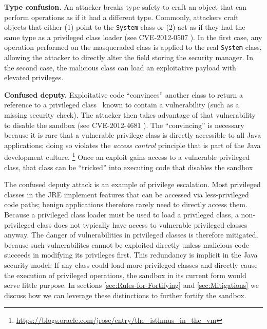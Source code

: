 \documentclass{sig-alternate}
\begin{document}
\noindent\textbf{Type confusion.} An attacker breaks type
safety to craft an object that can perform operations as if it had
a different type. Commonly, attackers craft objects that either
(1) point to the \texttt{System} class or (2) act as if they had
the same type as a privileged class loader (see CVE-2012-0507 \cite{_vulnerability_2012_0507}).
In the first case, any operation performed on the
masqueraded class is applied to the real \texttt{System} class, allowing
the attacker to directly alter the field storing the security manager. 
In the second case, the malicious class can load an exploitative
payload with elevated privileges.

\noindent\textbf{Confused deputy.} Exploitative code ``convinces'' another
class to return a reference to a privileged class~\cite{hardy_confused_1988}
known to contain a vulnerability (such as a missing security check).  The
attacker then takes advantage of that vulnerability to disable the sandbox 
(see CVE-2012-4681 \cite{_vulnerability_2012_4681}).
The ``convincing'' is necessary
because it is rare that a vulnerable privilege class is directly accessible
to all Java applications; doing so violates the \textit{access
control} principle that is part of the Java development culture.%
\footnote{\url{https://blogs.oracle.com/jrose/entry/the_isthmus_in_the_vm}%
} Once an exploit gains access to a vulnerable privileged class, that
class can be ``tricked'' into executing code that disables the sandbox

The confused deputy attack is an example of privilege escalation.  Most
privileged classes in the JRE implement features that can be accessed via
less-privileged code paths; benign applications therefore rarely need to
directly access them. 
%
Because a privileged class loader must be used to load a privileged class, 
a non-privileged class does not typically have access to vulnerable
privileged classes anyway. The danger of vulnerabilities in privileged
classes is therefore mitigated, because such vulnerabilites cannot be exploited
directly unless malicious code succeeds in modifying its privileges first. 
This redundancy is implicit in the Java security model: If any class
could load more privileged classes and directly cause the execution
of privileged operations, the sandbox in its current form would serve
little purpose. In sections \ref{sec:Rules-for-Fortifying} and \ref{sec:Mitigations}
we discuss how we can leverage these distinctions to further fortify
the sandbox.
\end{document}

